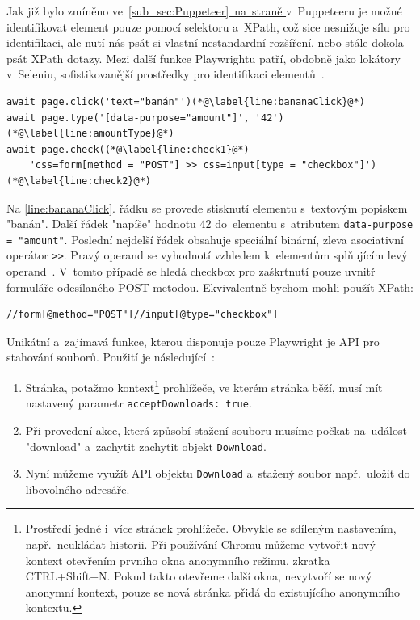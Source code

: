 \documentclass[12pt, a4paper, twoside]{article}
\newcommand{\codefigureSpacing}{1.2}
\newcommand{\refAddedText}[3]{\hyperref[#1]{#2\ref{#1}#3}}
\newcommand{\lineref}[2]{\refAddedText{#1}{}{.~#2}}
\newcommand*{\partialref}[2]{\hyperref[{#1}]{\ref{#2}~na~straně \pageref{#1}}}
\begin{document}
	Jak již bylo zmíněno ve~\partialref{text:puppeteerLocatorSupport}{sub_sec:Puppeteer} v~Puppeteeru je možné identifikovat element pouze pomocí selektoru a~XPath, což sice nesnižuje sílu pro identifikaci, ale nutí nás psát si vlastní nestandardní rozšíření, nebo stále dokola psát XPath dotazy. Mezi další funkce Playwrightu patří, obdobně jako lokátory v~Seleniu, sofistikovanější prostředky pro identifikaci elementů~\cite{playwrightApi}. 
	\begin{codefigure}[H]
		\renewcommand\baselinestretch{\codefigureSpacing}
		\begin{lstlisting}[style=MyJavaScript]
await page.click('text="banán"')(*@\label{line:bananaClick}@*)
await page.type('[data-purpose="amount"]', '42')(*@\label{line:amountType}@*)
await page.check((*@\label{line:check1}@*)
	'css=form[method = "POST"] >> css=input[type = "checkbox"]')(*@\label{line:check2}@*)
		\end{lstlisting}
		\caption{Akce se specificky identifikovanými elementy}
	\end{codefigure}
	Na \ref{line:bananaClick}. řádku se provede stisknutí elementu s~textovým popiskem "banán". Další řádek "napíše" hodnotu 42 do~elementu s~atributem \foreignlanguage{english}{\texttt{data-purpose = "amount"}}. Poslední nejdelší řádek obsahuje speciální binární, zleva asociativní operátor \texttt{>>}. Pravý operand se vyhodnotí vzhledem k~elementům splňujícím levý operand~\cite{playwrightApi}. V~tomto případě se hledá checkbox pro zaškrtnutí pouze uvnitř formuláře odesílaného POST metodou. Ekvivalentně bychom mohli použít XPath:
	\begin{codefigure}[H]
		\renewcommand\baselinestretch{\codefigureSpacing}
		\begin{lstlisting}[style=MyXPath]
//form[@method="POST"]//input[@type="checkbox"]
		\end{lstlisting}
	\caption{XPath ekvivalentní identifikátoru elementu na~\lineref{line:check2}{řádku}}
	\end{codefigure}
	
	Unikátní a~zajímavá funkce, kterou disponuje pouze Playwright je API pro stahování souborů. Použití je následující~\cite{playwrightApi}: 
	\begin{enumerate}
		\item Stránka, potažmo kontext\footnote{Prostředí jedné i~více stránek prohlížeče. Obvykle se sdíleným nastavením, např.~neukládat historii. Při používání Chromu můžeme vytvořit nový kontext otevřením prvního okna anonymního režimu, zkratka CTRL+Shift+N. Pokud takto otevřeme další okna, nevytvoří se nový anonymní kontext, pouze se nová stránka přidá do existujícího anonymního kontextu.} prohlížeče, ve kterém stránka běží, musí mít nastavený parametr \texttt{acceptDownloads: true}.
		\item Při provedení akce, která způsobí stažení souboru musíme počkat na~událost "download" a~zachytit zachytit objekt \texttt{Download}. 
		\item Nyní můžeme využít API objektu \texttt{Download} a~stažený soubor např.~uložit do libovolného adresáře. 
	\end{enumerate}
\end{document}
